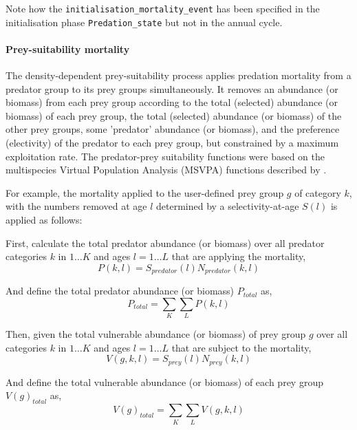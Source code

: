 Note how the \texttt{initialisation\_mortality\_event} has been specified in the initialisation phase \texttt{Predation\_state} but not in the annual cycle.

\paragraph{Prey-suitability mortality}

The density-dependent prey-suitability process applies predation mortality from a predator group to its prey groups simultaneously. It removes an abundance (or biomass) from each prey group according to the total (selected) abundance (or biomass) of each prey group, the total (selected) abundance (or biomass) of the other prey groups, some 'predator' abundance (or biomass), and the preference (electivity) of the predator to each prey group, but constrained by a maximum exploitation rate. The predator-prey suitability functions were based on the multispecies Virtual Population Analysis (MSVPA) functions described by \citep{JuradoMolina2005}.

For example, the mortality applied to the user-defined prey group $g$ of category $k$, with the numbers removed at age $l$ determined by a selectivity-at-age $S(l)$ is applied as follows:

First, calculate the total predator abundance (or biomass) over all predator categories $k$ in $1 \ldots K$ and ages $l = 1 \ldots L$ that are applying the mortality,
\begin{equation}
P(k,l) = S_{predator}(l) N_{predator}(k,l)
\end{equation}

And define the total predator abundance (or biomass) $P_{total}$ as,
\begin{equation}
P_{total}  = \sum\limits_K {\sum\limits_L {P(k,l)}}
\end{equation}

Then, given the total vulnerable abundance (or biomass) of prey group $g$ over all categories $k$ in $1 \ldots K$ and ages $l = 1 \ldots L$ that are subject to the mortality,
\begin{equation}
V(g,k,l) = S_{prey}(l) N_{prey}(k,l)
\end{equation}

And define the total vulnerable abundance (or biomass) of each prey group $V(g)_{total}$ as,
\begin{equation}
V(g)_{total}  = \sum\limits_K {\sum\limits_L {V(g,k,l)}}
\end{equation}

